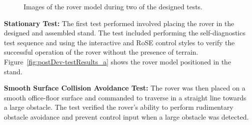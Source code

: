     \begin{TEST}
      \begin{figure}[h!]
        \centering
        \caption[Images of the rover model during two of the designed tests.]{Images of the rover model during two of the designed tests.}
        \label{fig:postDev-testResults}
      \end{figure}
    
    
      \item\label{test:stationaryTest} \textbf{Stationary Test:} The first test performed involved placing the rover in the designed and assembled stand. The test included performing the self-diagnostics test sequence and using the interactive and RoSE control styles to verify the successful operation of the rover without the presence of terrain. Figure~\ref{fig:postDev-testResults_a} shows the rover model positioned in the stand.
      
      \item\label{test:collisionTest} \textbf{Smooth Surface Collision Avoidance Test:} The rover was then placed on a smooth office-floor surface and commanded to traverse in a straight line towards a large obstacle. The test verified the rover's ability to perform rudimentary obstacle avoidance and prevent control input when a large obstacle was detected.
      

\end{TEST}
